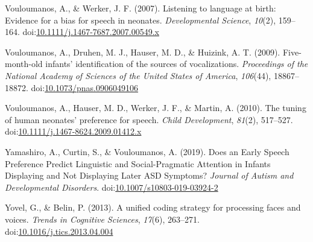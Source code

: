 \documentclass[man]{apa6}
\begin{document}
\hypertarget{ref-vouloumanos_listening_2007}{}
Vouloumanos, A., \& Werker, J. F. (2007). Listening to language at
birth: Evidence for a bias for speech in neonates. \emph{Developmental
Science}, \emph{10}(2), 159--164.
doi:\href{https://doi.org/10.1111/j.1467-7687.2007.00549.x}{10.1111/j.1467-7687.2007.00549.x}

\hypertarget{ref-vouloumanos_five-month-old_2009}{}
Vouloumanos, A., Druhen, M. J., Hauser, M. D., \& Huizink, A. T. (2009).
Five-month-old infants' identification of the sources of vocalizations.
\emph{Proceedings of the National Academy of Sciences of the United
States of America}, \emph{106}(44), 18867--18872.
doi:\href{https://doi.org/10.1073/pnas.0906049106}{10.1073/pnas.0906049106}

\hypertarget{ref-vouloumanos_tuning_2010}{}
Vouloumanos, A., Hauser, M. D., Werker, J. F., \& Martin, A. (2010). The
tuning of human neonates' preference for speech. \emph{Child
Development}, \emph{81}(2), 517--527.
doi:\href{https://doi.org/10.1111/j.1467-8624.2009.01412.x}{10.1111/j.1467-8624.2009.01412.x}

\hypertarget{ref-yamashiro_does_2019}{}
Yamashiro, A., Curtin, S., \& Vouloumanos, A. (2019). Does an Early
Speech Preference Predict Linguistic and Social-Pragmatic Attention in
Infants Displaying and Not Displaying Later ASD Symptoms? \emph{Journal
of Autism and Developmental Disorders}.
doi:\href{https://doi.org/10.1007/s10803-019-03924-2}{10.1007/s10803-019-03924-2}

\hypertarget{ref-yovel_unified_2013}{}
Yovel, G., \& Belin, P. (2013). A unified coding strategy for processing
faces and voices. \emph{Trends in Cognitive Sciences}, \emph{17}(6),
263--271.
doi:\href{https://doi.org/10.1016/j.tics.2013.04.004}{10.1016/j.tics.2013.04.004}

\endgroup
\end{document}
